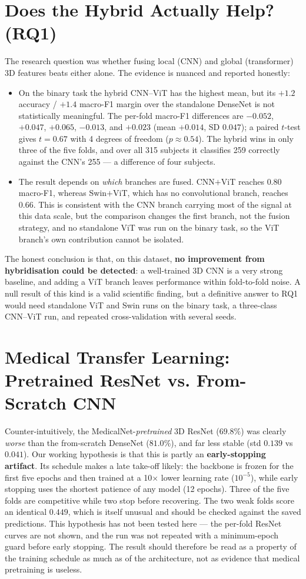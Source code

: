 \section{Does the Hybrid Actually Help? (RQ1)}\label{sec:rq1}
The research question was whether fusing local (CNN) and global (transformer) 3D features beats either alone. The evidence is nuanced and reported honestly:
\begin{itemize}
    \item On the binary task the hybrid CNN--ViT has the highest mean, but its $+1.2$ accuracy / $+1.4$ macro-F1 margin over the standalone DenseNet is not statistically meaningful. The per-fold macro-F1 differences are $-0.052$, $+0.047$, $+0.065$, $-0.013$, and $+0.023$ (mean $+0.014$, SD $0.047$); a paired $t$-test gives $t=0.67$ with 4 degrees of freedom ($p\approx0.54$). The hybrid wins in only three of the five folds, and over all 315 subjects it classifies 259 correctly against the CNN's 255 --- a difference of four subjects.
    \item The result depends on \emph{which} branches are fused. CNN$+$ViT reaches $0.80$ macro-F1, whereas Swin$+$ViT, which has no convolutional branch, reaches $0.66$. This is consistent with the CNN branch carrying most of the signal at this data scale, but the comparison changes the first branch, not the fusion strategy, and no standalone ViT was run on the binary task, so the ViT branch's own contribution cannot be isolated.
\end{itemize}
The honest conclusion is that, on this dataset, \textbf{no improvement from hybridisation could be detected}: a well-trained 3D CNN is a very strong baseline, and adding a ViT branch leaves performance within fold-to-fold noise. A null result of this kind is a valid scientific finding, but a definitive answer to RQ1 would need standalone ViT and Swin runs on the binary task, a three-class CNN--ViT run, and repeated cross-validation with several seeds.

\section{Medical Transfer Learning: Pretrained ResNet vs. From-Scratch CNN}
Counter-intuitively, the MedicalNet-\emph{pretrained} 3D ResNet ($69.8\%$) was clearly \emph{worse} than the from-scratch DenseNet ($81.0\%$), and far less stable (std $0.139$ vs $0.041$). Our working hypothesis is that this is partly an \textbf{early-stopping artifact}. Its schedule makes a late take-off likely: the backbone is frozen for the first five epochs and then trained at a 10$\times$ lower learning rate ($10^{-5}$), while early stopping uses the shortest patience of any model (12 epochs). Three of the five folds are competitive while two stop before recovering. The two weak folds score an identical $0.449$, which is itself unusual and should be checked against the saved predictions. This hypothesis has not been tested here --- the per-fold ResNet curves are not shown, and the run was not repeated with a minimum-epoch guard before early stopping. The result should therefore be read as a property of the training schedule as much as of the architecture, not as evidence that medical pretraining is useless.

